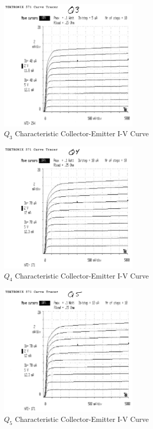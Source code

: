 \documentclass[titlepage, letterpaper, 10.5pt]{article}
\begin{document}
\begin{figure}[ht]
	\centering
	\includegraphics[width=0.6\textwidth]{results/q3-characteristics}
	\caption{$Q_{3}$ Characteristic Collector-Emitter I-V Curve}
\end{figure}

\begin{figure}[ht]
	\centering
	\includegraphics[width=0.6\textwidth]{results/q4-characteristics}
	\caption{$Q_{4}$ Characteristic Collector-Emitter I-V Curve}
\end{figure}

\begin{figure}[ht]
	\centering
	\includegraphics[width=0.6\textwidth]{results/q5-characteristics}
	\caption{$Q_{5}$ Characteristic Collector-Emitter I-V Curve}
\end{figure}
\end{document}
